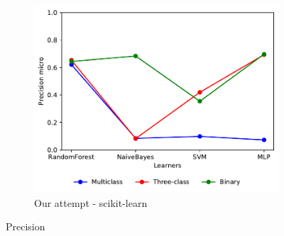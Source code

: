\begin{figure}[H]
\begin{subfigure}[t]{0.4\textwidth}
        \includegraphics[width=\linewidth, page = 3]{images/precision}
        \caption{Our attempt - scikit-learn}
    \end{subfigure}
    \caption{Precision}
    \label{fig:prec}
\end{figure}

